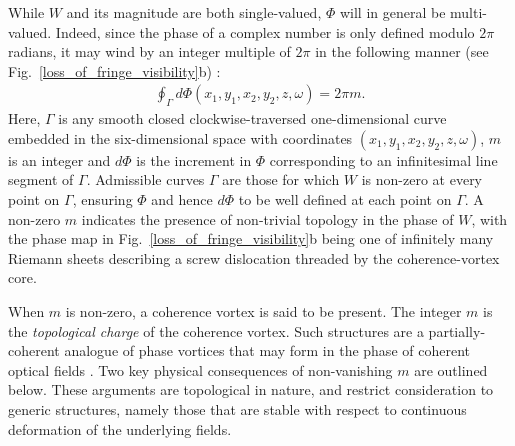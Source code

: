 \documentclass{iucr}              %
\newcommand{\inblue}[1]{{\color{blue}#1}}
\begin{document}
While $W$ and its magnitude are both single-valued, $\Phi$ will in general be multi-valued. Indeed, since the phase of a complex number is only defined modulo $2\pi$ radians, it may wind by an integer multiple of $2\pi$ in the following manner (see \inblue{Fig.~\ref{loss_of_fringe_visibility}b)} \cite{GburVisser2003}: 
\begin{equation}
\begin{aligned}
\label{phase_of_W_winding}
\oint_{\Gamma} d\Phi(x_1,y_1,x_2,y_2,z,\omega)=2\pi m.
\end{aligned}
\end{equation}
Here, $\Gamma$ is any smooth closed clockwise-traversed one-dimensional curve embedded in the six-dimensional space with coordinates $(x_1,y_1,x_2,y_2,z,\omega)$, $m$ is an integer and $d\Phi$ is the increment in $\Phi$ corresponding to an infinitesimal line segment of $\Gamma$.  Admissible curves $\Gamma$ are those for which $W$ is non-zero at every point on $\Gamma$, ensuring $\Phi$ and hence $d\Phi$ to be well defined at each point on $\Gamma$.  A non-zero $m$ indicates the presence of non-trivial topology in the phase of $W$, with the phase map in Fig.~\ref{loss_of_fringe_visibility}b being one of infinitely many Riemann sheets describing a screw dislocation threaded by the coherence-vortex core. 

When $m$ is non-zero, a coherence vortex \cite{GburVisser2003} is said to be present.  The integer $m$ is the {\em topological charge} of the coherence vortex.  Such structures are a partially-coherent analogue of phase vortices that may form in the phase of coherent optical fields \cite{NyeBerry1974,Nye1999,SoskinVasnetsov2001,DennisProgOpt2009}.  Two key physical consequences of non-vanishing $m$ are outlined below.  These arguments are topological in nature, and restrict consideration to generic structures, namely those that are stable with respect to continuous deformation of the underlying fields. 
\end{document}
